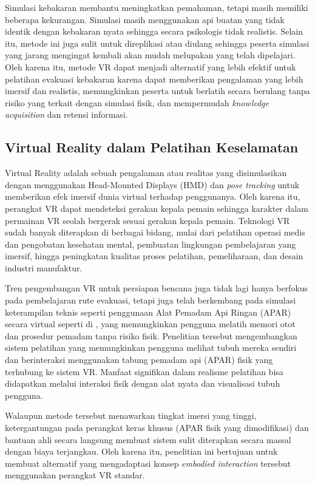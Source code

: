 Simulasi kebakaran membantu meningkatkan pemahaman, tetapi masih memiliki beberapa kekurangan. Simulasi masih menggunakan api buatan yang tidak identik dengan kebakaran nyata sehingga secara psikologis tidak realistis. Selain itu, metode ini juga sulit untuk direplikasi atau diulang sehingga peserta simulasi yang jarang mengingat kembali akan mudah melupakan yang telah dipelajari. Oleh karena itu, metode VR dapat menjadi alternatif yang lebih efektif untuk pelatihan evakuasi kebakaran karena dapat memberikan pengalaman yang lebih imersif dan realistis, memungkinkan peserta untuk berlatih secara berulang tanpa risiko yang terkait dengan simulasi fisik, dan mempermudah \textit{knowledge acquisition} dan retensi informasi\cite{morelot_virtual_2021}\cite{scorgie_virtual_2024}.

\subsection{Virtual Reality dalam Pelatihan Keselamatan}
Virtual Reality adalah sebuah pengalaman atau realitas yang disimulasikan dengan menggunakan Head-Mounted Displays (HMD) dan \textit{pose tracking} untuk memberikan efek imersif dunia virtual terhadap penggunanya. Oleh karena itu, perangkat VR dapat mendeteksi gerakan kepala pemain sehingga karakter dalam permainan VR seolah bergerak sesuai gerakan kepala pemain. Teknologi VR sudah banyak diterapkan di berbagai bidang, mulai dari pelatihan operasi medis dan pengobatan kesehatan mental, pembuatan lingkungan pembelajaran yang imersif, hingga peningkatan kualitas proses pelatihan, pemeliharaan, dan desain industri manufaktur\cite{pujiono2024arvr}.

Tren pengembangan VR untuk persiapan bencana juga tidak lagi hanya berfokus pada pembelajaran rute evakuasi, tetapi juga telah berkembang pada simulasi keterampilan teknis seperti penggunaan Alat Pemadam Api Ringan (APAR) secara virtual seperti di \cite{10972825}, yang memungkinkan pengguna melatih memori otot dan prosedur pemadam tanpa risiko fisik. Penelitian tersebut mengembangkan sistem pelatihan yang memungkinkan pengguna melihat tubuh mereka sendiri dan berinteraksi menggunakan tabung pemadam api (APAR) fisik yang terhubung ke sistem VR. Manfaat signifikan dalam realisme pelatihan bisa didapatkan melalui interaksi fisik dengan alat nyata dan visualisasi tubuh pengguna.

Walaupun metode tersebut menawarkan tingkat imersi yang tinggi, ketergantungan pada perangkat keras khusus (APAR fisik yang dimodifikasi) dan bantuan ahli secara langsung membuat sistem sulit diterapkan secara massal dengan biaya terjangkau. Oleh karena itu, penelitian ini bertujuan untuk membuat alternatif yang mengadaptasi konsep \textit{embodied interaction} tersebut menggunakan perangkat VR standar.

